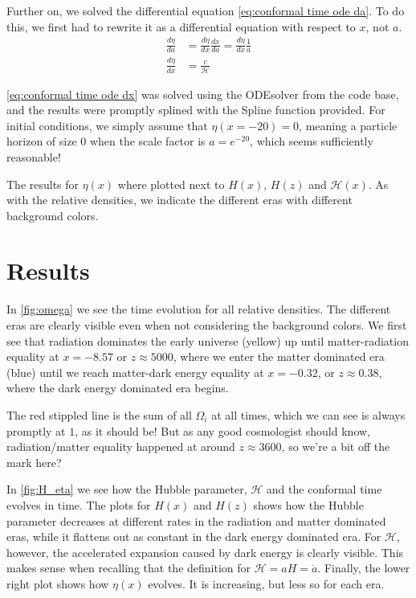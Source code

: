\documentclass[12pt]{article}
\begin{document}
Further on, we solved the differential equation \cref{eq:conformal time ode da}. To do this, we first had to rewrite it as a differential equation with respect to $x$, not $a$. 
\begin{align}\label{eq:conformal time ode dx}
    \frac{d\eta}{da} &= \frac{d\eta}{dx}\frac{dx}{da} = \frac{d\eta}{dx}\frac{1}{a} \nonumber \\ 
    \frac{d\eta}{dx} &= \frac{c}{\mathcal{H}}
\end{align}

\cref{eq:conformal time ode dx} was solved using the ODEsolver from the code base, and the results were promptly splined with the Spline function provided. For initial conditions, we simply assume that $\eta(x=-20) = 0$, meaning a particle horizon of size $0$ when the scale factor is $a=e^{-20}$, which seems sufficiently reasonable!

The results for $\eta(x)$ where plotted next to $H(x)$, $H(z)$ and $\mathcal{H}(x)$. As with the relative densities, we indicate the different eras with different background colors.

\section{Results}
In \cref{fig:omega} we see the time evolution for all relative densities. The different eras are clearly visible even when not considering the background colors. We first see that radiation dominates the early universe (yellow) up until matter-radiation equality at $x=-8.57$ or $z\approx 5000$, where we enter the matter dominated era (blue) until we reach matter-dark energy equality at $x=-0.32$, or $z\approx 0.38$, where the dark energy dominated era begins. 

The red stippled line is the sum of all $\Omega_i$ at all times, which we can see is always promptly at $1$, as it should be! But as any good cosmologist should know, radiation/matter equality happened at around $z\approx 3600$, so we're a bit off the mark here? 

In \cref{fig:H_eta} we see how the Hubble parameter, $\mathcal{H}$ and the conformal time evolves in time. The plots for $H(x)$ and $H(z)$ shows how the Hubble parameter decreases at different rates in the radiation and matter dominated eras, while it flattens out as constant in the dark energy dominated era. For $\mathcal{H}$, however, the accelerated expansion caused by dark energy is clearly visible. This makes sense when recalling that the definition for $\mathcal{H} = aH = \dot{a}$. Finally, the lower right plot shows how $\eta(x)$ evolves. It is increasing, but less so for each era.
\end{document}
